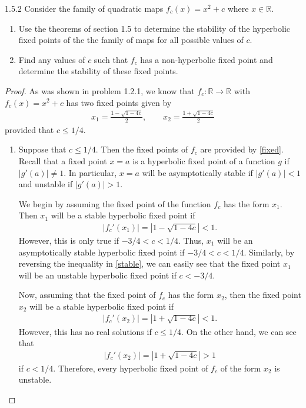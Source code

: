 \begin{problem}{1.5.2}
  Consider the family of quadratic maps $f_c(x) = x^2 + c$ where $x\in\mathbb{R}$.
  \begin{enumerate}
    \item Use the theorems of section 1.5 to determine the stability of the hyperbolic fixed points of the
      the family of maps for all possible values of $c$.
    \item Find any values of $c$ such that $f_c$ has a non-hyperbolic fixed point and
      determine the stability of these fixed points.
  \end{enumerate}
\end{problem}

\begin{proof}
  As was shown in problem 1.2.1, we know that $f_c:\mathbb{R}\to\mathbb{R}$ with $f_c(x) = x^2 + c$
  has two fixed points given by
  \begin{align}\label{fixed}
    x_1 = \frac{1 - \sqrt{1 - 4c}}{2}, \qquad         x_2 = \frac{1 + \sqrt{1 - 4c}}{2}
  \end{align}
  provided that $c \leq 1/4$.

  \begin{enumerate}
    \item Suppose that $c \leq 1/4$. Then the fixed points of
      $f_c$ are provided by \eqref{fixed}. Recall that a fixed point $x = a$ is a hyperbolic fixed point of
      a function $g$ if $|g'(a)| \neq 1$. In particular, $x = a$ will be asymptotically stable if $|g'(a)| < 1$
      and unstable if $|g'(a)| > 1$.

      We begin by assuming the fixed point of the function $f_c$ has the form $x_1$. Then $x_1$ will be a stable hyperbolic
      fixed point if
      \begin{align}\label{stable}
        |f_c'(x_1)| = \left|1 - \sqrt{1-4c} \right| < 1.
      \end{align}
      However, this is only true if $-3/4 < c < 1/4$. Thus, $x_1$ will be an asymptotically stable hyperbolic fixed point if $-3/4 < c < 1/4$.
      Similarly, by reversing the inequality in \eqref{stable},
      we can easily see that the fixed point $x_1$ will be an unstable hyperbolic fixed point if $c < -3/4$.

      Now, assuming that the fixed point of $f_c$ has the form $x_2$, then the fixed point $x_2$ will be a stable hyperbolic fixed point if
      \begin{align*}
        |f_c'(x_2)| = \left|1 + \sqrt{1-4c}\right| < 1.
      \end{align*}
      However, this has no real solutions if $c \leq 1/4$. On the other hand, we can see that
      \begin{align*}
        |f_c'(x_2)| = \left|1 + \sqrt{1-4c}\right| > 1
      \end{align*}
      if $c < 1/4$. Therefore, every hyperbolic fixed point of $f_c$ of the form $x_2$ is unstable.


\end{enumerate}
\end{proof}
